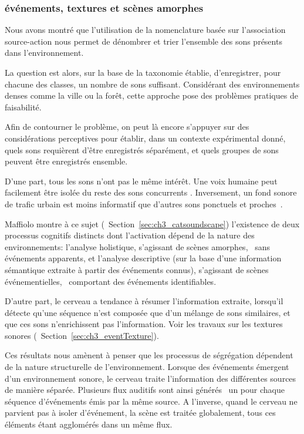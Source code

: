 \subsubsection{événements, textures et scènes amorphes}
\label{sec:ch4_eventTextureAmorphe}

Nous avons montré que l'utilisation de la nomenclature basée sur l’association source-action nous permet de dénombrer et trier l'ensemble des sons présents dans l'environnement.

La question est alors, sur la base de la taxonomie établie, d'enregistrer, pour chacune des classes, un nombre de sons suffisant. Considérant des environnements denses comme la ville ou la forêt, cette approche pose des problèmes pratiques de faisabilité.

Afin de contourner le problème, on peut là encore s’appuyer sur des considérations perceptives pour établir, dans un contexte expérimental donné, quels sons requièrent d'être enregistrés séparément, et quels groupes de sons peuvent être enregistrés ensemble.

D'une part, tous les sons n'ont pas le même intérêt. Une voix humaine peut facilement être isolée du reste des sons concurrents \citep{carlyon2004brain}. Inversement, un fond sonore de trafic urbain est moins informatif que d'autres sons ponctuels et proches~\citep{southworth1969sonic}.

Maffiolo montre à ce sujet (\cf~Section~\ref{sec:ch3_catsoundscape}) l'existence de deux processus cognitifs distincts dont l'activation dépend de la nature des environnements: l'analyse holistique, s'agissant de scènes amorphes, \ie~sans événements apparents, et l'analyse descriptive (sur la base d'une information sémantique extraite à partir des événements connus), s'agissant de scènes événementielles, \ie~comportant des événements identifiables.

D'autre part, le cerveau a tendance à résumer l'information extraite, lorsqu'il détecte qu'une séquence n'est composée que d'un mélange de sons similaires, et que ces sons n'enrichissent pas l'information. Voir les travaux sur les textures sonores (\cf~Section~\ref{sec:ch3_eventTexture}). 

Ces résultats nous amènent à penser que les processus de ségrégation dépendent de la nature structurelle de l'environnement. Lorsque des événements émergent d'un environnement sonore, le cerveau traite l'information des différentes sources de manière séparée. Plusieurs flux auditifs sont ainsi générés \ie~un pour chaque séquence d'événements émis par la même source. A l'inverse, quand le cerveau ne parvient pas à isoler d'événement, la scène est traitée globalement, tous ces éléments étant agglomérés dans un même flux.

